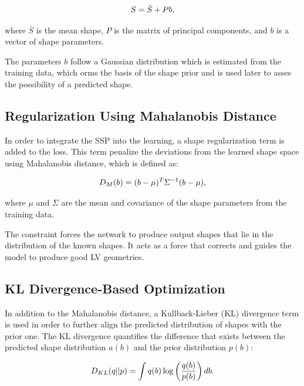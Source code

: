 \begin{equation} 
\addcontentsline{equ}{equations}{\protect\numberline{\theequation}Statistical Shape Model}
    S = \bar{S} + Pb, 
\end{equation} 

where $\bar{S}$ is the mean shape, $P$ is the matrix of principal components, and $b$ is a vector of shape parameters.

The parameters $b$ follow a Gaussian distribution which is estimated from the training data, which orms the basis of the shape prior and is used later to asses the possibility of a predicted shape.

\subsection{Regularization Using Mahalanobis Distance}
In order to integrate the SSP into the learning, a shape regularization term is added to the loss. This term penalize the deviations from the learned shape space using Mahalanobis distance, which is defined as:

\begin{equation} 
\addcontentsline{equ}{equations}{\protect\numberline{\theequation}Mahalanobis Distance}
    D_M(b) = (b - \mu)^T \Sigma^{-1} (b - \mu), 
\end{equation}

where $\mu$ and $\Sigma$ are the mean and covariance of the shape parameters from the training data.

The constraint forces the network to produce output shapes that lie in the distribution of the known shapes. It acts as a force that corrects and guides the model to produce good LV geometries.

\subsection{KL Divergence-Based Optimization}
In addition to the Mahalanobis distance, a Kullback-Lieber (KL) divergence term is used in order to further align the predicted distribution of shapes with the prior one. The KL divergence quantifies the difference that exists between the predicted shape distribution $a(b)$ and the prior distribution $p(b)$:

\begin{equation} 
\addcontentsline{equ}{equations}{\protect\numberline{\theequation}KL Divergence}
    D_{KL}(q || p) = \int q(b) \log \left(\frac{q(b)}{p(b)}\right) db. 
\end{equation}

